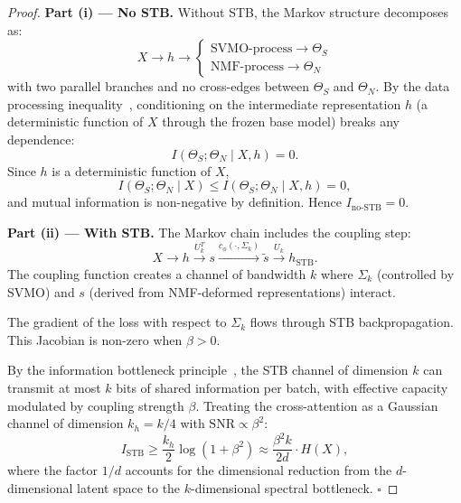 \documentclass[conference]{IEEEtran}
\begin{document}
\begin{proof}
\textbf{Part (i) --- No STB.}
Without STB, the Markov structure decomposes as:
\begin{equation}
X \to h \to 
\begin{cases}
\text{SVMO-process} \to \Theta_S \\
\text{NMF-process} \to \Theta_N
\end{cases}
\end{equation}
with two parallel branches and no cross-edges between $\Theta_S$ and $\Theta_N$. By the data processing inequality~\cite{cover2006elements}, conditioning on the intermediate representation $h$ (a deterministic function of $X$ through the frozen base model) breaks any dependence:
\begin{equation}
I(\Theta_S; \Theta_N \mid X, h) = 0.
\end{equation}
Since $h$ is a deterministic function of $X$,
\begin{equation}
I(\Theta_S; \Theta_N \mid X) \leq I(\Theta_S; \Theta_N \mid X, h) = 0,
\end{equation}
and mutual information is non-negative by definition. Hence $I_{\text{no-STB}} = 0$.

\textbf{Part (ii) --- With STB.}
The Markov chain includes the coupling step:
\begin{equation}
X \to h \xrightarrow{U_k^T} s \xrightarrow{c_\phi(\cdot, \Sigma_k)} \tilde{s} \xrightarrow{U_k} h_{\text{STB}}.
\end{equation}
The coupling function creates a channel of bandwidth $k$ where $\Sigma_k$ (controlled by SVMO) and $s$ (derived from NMF-deformed representations) interact.

The gradient of the loss with respect to $\Sigma_k$ flows through STB backpropagation. This Jacobian is non-zero when $\beta > 0$.

By the information bottleneck principle~\cite{tishby1999information}, the STB channel of dimension $k$ can transmit at most $k$ bits of shared information per batch, with effective capacity modulated by coupling strength $\beta$. Treating the cross-attention as a Gaussian channel of dimension $k_h = k/4$ with $\text{SNR} \propto \beta^2$:
\begin{equation}
I_{\text{STB}} \geq \frac{k_h}{2}\log(1 + \beta^2) \approx \frac{\beta^2 k}{2d} \cdot H(X),
\end{equation}
where the factor $1/d$ accounts for the dimensional reduction from the $d$-dimensional latent space to the $k$-dimensional spectral bottleneck. $\square$
\end{proof}
\end{document}
